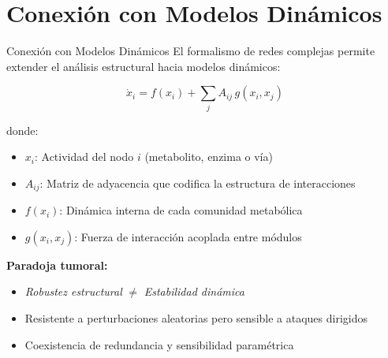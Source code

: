 \documentclass[aspectratio=169, 11pt]{beamer}
\begin{document}
	\section{Conexión con Modelos Dinámicos}
	\begin{frame}{Conexión con Modelos Dinámicos}
		El formalismo de redes complejas permite extender el análisis estructural hacia modelos dinámicos:
		
		\begin{equation}
			\dot{x}_i = f(x_i) + \sum_{j} A_{ij} \, g(x_i, x_j)
		\end{equation}
		
		donde:
		\begin{itemize}
			\item $x_i$: Actividad del nodo $i$ (metabolito, enzima o vía)
			\item $A_{ij}$: Matriz de adyacencia que codifica la estructura de interacciones
			\item $f(x_i)$: Dinámica interna de cada comunidad metabólica
			\item $g(x_i, x_j)$: Fuerza de interacción acoplada entre módulos
		\end{itemize}
		
		\vspace{0.3cm}
		\textbf{Paradoja tumoral:}
		\begin{itemize}
			\item \textit{Robustez estructural} $\neq$ \textit{Estabilidad dinámica}
			\item Resistente a perturbaciones aleatorias pero sensible a ataques dirigidos
			\item Coexistencia de redundancia y sensibilidad paramétrica
		\end{itemize}
	\end{frame}
	
\end{document}
